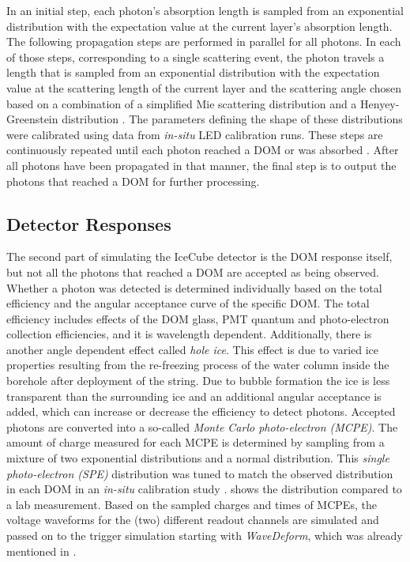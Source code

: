 In an initial step, each photon's absorption length is sampled from an exponential distribution with the expectation value at the current layer's absorption length. The following propagation steps are performed in parallel for all photons. In each of those steps, corresponding to a single scattering event, the photon travels a length that is sampled from an exponential distribution with the expectation value at the scattering length of the current layer and the scattering angle chosen based on a combination of a simplified Mie scattering distribution  and a Henyey-Greenstein distribution . The parameters defining the shape of these distributions were calibrated using data from \textit{in-situ} LED calibration runs. These steps are continuously repeated until each photon reached a DOM or was absorbed . After all photons have been propagated in that manner, the final step is to output the photons that reached a DOM for further processing.


\subsection{Detector Responses}

The second part of simulating the IceCube detector is the DOM response itself, but not all the photons that reached a DOM are accepted as being observed. Whether a photon was detected is determined individually based on the total efficiency and the angular acceptance curve of the specific DOM. The total efficiency includes effects of the DOM glass, PMT quantum and photo-electron collection efficiencies, and it is wavelength dependent. Additionally, there is another angle dependent effect called \textit{hole ice}. This effect is due to varied ice properties resulting from the re-freezing process of the water column inside the borehole after deployment of the string. Due to bubble formation the ice is less transparent than the surrounding ice and an additional angular acceptance is added, which can increase or decrease the efficiency to detect photons. Accepted photons are converted into a so-called \textit{Monte Carlo photo-electron (MCPE)}. The amount of charge measured for each MCPE is determined by sampling from a mixture of two exponential distributions and a normal distribution. This \textit{single photo-electron (SPE)} distribution was tuned to match the observed distribution in each DOM in an \textit{in-situ} calibration study .  shows the distribution compared to a lab measurement. Based on the sampled charges and times of MCPEs, the voltage waveforms for the (two) different readout channels are simulated and passed on to the trigger simulation starting with \textit{WaveDeform}, which was already mentioned in .

